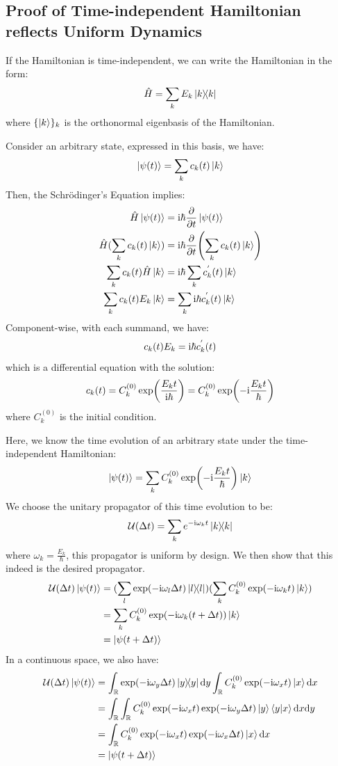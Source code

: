 \subsection{Proof of Time-independent Hamiltonian reflects Uniform Dynamics}
If the Hamiltonian is time-independent, we can write the Hamiltonian in the form:
$$\hamiltonian = \Sumi{k}E_k \dyad{k}$$
where $\{\ket{k}\}_k$ is the orthonormal eigenbasis of the Hamiltonian. \par
Consider an arbitrary state, expressed in this basis, we have:
$$\ket{\psi(t)} = \sum_{k}c_k(t) \ket{k}$$
Then, the Schr\"odinger's Equation implies:
\begin{align*}
    \hat{H}\ket{\psi(t)} &= \mathrm{i} \hbar \pdv{t}\ket{\psi(t)} \\
    \hat{H} (\sum_{k}c_k(t) \ket{k}) &= \mathrm{i} \hbar \pdv{t}(\sum_{k}c_k(t) \ket{k}) \\
    \sum_{k}c_k(t) \hat{H} \ket{k} &= \mathrm{i} \hbar \sum_{k}c_k^{'}(t) \ket{k} \\
    \sum_{k}c_k(t) E_k \ket{k} &= \sum_{k} \mathrm{i} \hbar c_k^{'}(t) \ket{k}
\end{align*}
Component-wise, with each summand, we have:
$$c_k(t) E_k = \mathrm{i} \hbar c_k^{'}(t)$$
which is a differential equation with the solution:
$$c_k(t) = C_k^{(0)}\exp(\frac{E_k t}{\mathrm{i} \hbar}) = C_k^{(0)}\exp(-\mathrm{i} \frac{E_k t}{\hbar})$$
where $C_k^{(0)}$ is the initial condition. \par
Here, we know the time evolution of an arbitrary state under the time-independent Hamiltonian:
$$\ket{\psi(t)} = \sum_{k} C_k^{(0)}\exp(-\mathrm{i} \frac{E_k t}{\hbar}) \ket{k}$$
We choose the unitary propagator of this time evolution to be:
$$\opuni(\Delta t) = \Sumi{k} e^{-\imag \omega_k t}\dyad{k}$$
where $\omega_k = \frac{E_k}{\hbar}$, this propagator is uniform by design. We then show that this indeed is the desired propagator.
\begin{align*}
    \opuni(\Delta t)\ket{\psi(t)} &= (\Sumi{l} \exp(-\imag \omega_l \Delta t) \dyad{l})(\Sumi{k} C_k^{(0)}\exp(-\imag \omega_k t) \ket{k}) \\
    &= \Sumi{k} C_k^{(0)} \exp(-\imag \omega_k (t + \Delta t)) \ket{k} \\
    &= \ket{\psi(t+\Delta t)}
\end{align*}
In a continuous space, we also have:
\begin{align*}
    \opuni(\Delta t)\ket{\psi(t)} &= \intR \exp(-\imag \omega_y \Delta t) \dyad{y} \dd y \intR C_k^{(0)} \exp(-\imag \omega_x t) \ket{x} \dd x \\
    &= \intR\intR C_k^{(0)} \exp(-\imag \omega_x t) \exp(-\imag \omega_y \Delta t) \ket{y}\braket{y}{x} \dd x \dd y \\
    &= \intR C_k^{(0)} \exp(-\imag \omega_x t) \exp(-\imag \omega_x \Delta t) \ket{x} \dd x \\
    &= \ket{\psi(t+\Delta t)}
\end{align*}

